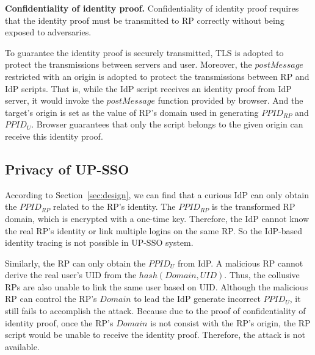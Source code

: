 \vspace{1mm}\noindent\textbf{Confidentiality of identity proof.}
Confidentiality of identity proof requires that the identity proof must be transmitted to RP correctly without being exposed to adversaries.

To guarantee the identity proof is securely transmitted, TLS is adopted to protect the transmissions between servers and user.
Moreover, the $postMessage$ restricted with an origin is adopted to protect the transmissions between RP and IdP scripts. That is, while the IdP script receives an identity proof from IdP server, it would invoke the $postMessage$ function provided by browser. And the target's origin is set as the value of RP's domain used in generating $PPID_{RP}$ and $PPID_U$. Browser guarantees that only the script belongs to the given origin can receive this identity proof.




\subsection{Privacy of UP-SSO}
According to Section~\ref{sec:design}, we can find that a curious IdP can only obtain the $PPID_{RP}$ related to the RP's identity. The $PPID_{RP}$ is the transformed RP domain, which is encrypted with a one-time key. Therefore, the IdP cannot know the real RP's identity or link multiple logins on the same RP. So the IdP-based identity tracing is not possible in UP-SSO system. 

Similarly, the RP can only obtain the $PPID_U$ from IdP. A malicious RP cannot derive the real user's UID from the $hash(Domain, UID)$. Thus, the collusive RPs are also unable to link the same user based on UID. Although the malicious RP can control the RP's $Domain$ to lead the IdP generate incorrect $PPID_U$, it still fails to accomplish the attack. Because due to the proof of confidentiality of identity proof, once the RP's $Domain$ is not consist with the RP's origin, the RP script would be unable to receive the identity proof. Therefore, the attack is not available. 

